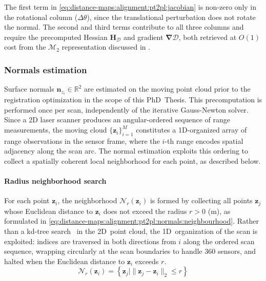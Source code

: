 The first term in \eqref{eq:distance-maps:alignment:pt2pl:jacobian} is non-zero
only in the rotational column ($\Delta\theta$), since the translational
perturbation does not rotate the normal. The second and third terms contribute
to all three columns and require the precomputed Hessian
$\mathbf{H}_{\mathcal{D}}$ and gradient $\bm{\nabla}\mathcal{D}$, both
retrieved at $O(1)$ cost from the $\mathcal{M}_2$ representation discussed in
.

\subsubsection{Normals estimation}
\label{sec:distance-maps:alignment:pt2pl:normals}

Surface normals $\mathbf{n}_{z_i} \in \mathbb{R}^2$ are estimated
on the moving point cloud prior to the registration optimization in the scope
of this PhD~Thesis. This precomputation is performed once per scan,
independently of the iterative Gauss-Newton solver.
Since a 2D laser scanner produces an angular-ordered sequence of range
measurements, the moving cloud $\{\mathbf{z}_i\}_{i=1}^{M}$ constitutes a
1D-organized array of range observations in the sensor frame, where the $i$-th
range encodes spatial adjacency along the scan arc.
The normal estimation exploits this ordering to collect a spatially coherent
local neighborhood for each point, as described below.

\paragraph{Radius neighborhood search}
For each point $\mathbf{z}_i$, the neighborhood $\mathcal{N}_r(\mathbf{z}_i)$
is formed by collecting all points $\mathbf{z}_j$ whose Euclidean distance to
$\mathbf{z}_i$ does not exceed the radius $r > 0$ (m), as formulated in
\eqref{eq:distance-maps:alignment:pt2pl:normals:neighbourhood}.
Rather than a kd-tree search~\cite{bentley:cacm:1975} in the 2D~point cloud,
the 1D~organization of the scan is exploited:
indices are traversed in both directions from $i$ along the ordered
scan sequence, wrapping circularly at the scan boundaries to handle
360\textdegree{} sensors, and halted when the Euclidean distance to
$\mathbf{z}_i$ exceeds $r$.
\begin{equation}
\label{eq:distance-maps:alignment:pt2pl:normals:neighbourhood}
\mathcal{N}_r(\mathbf{z}_i) =
\left\{\mathbf{z}_j \mid \| \mathbf{z}_j - \mathbf{z}_i\| _2 \leq r \right\}
\end{equation}

